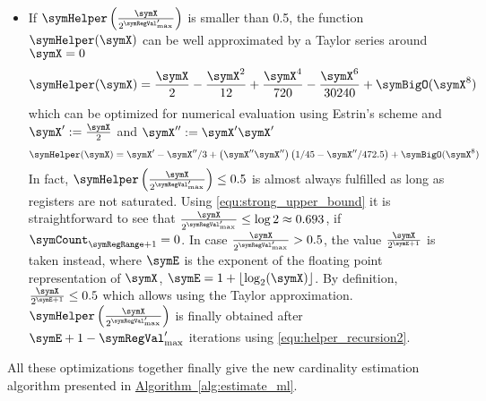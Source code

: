 \documentclass[a4paper]{scrartcl}
\newcommand*{\algoref}[1]{\hyperref[#1]{Algorithm~\ref*{#1}}}
\begin{document}
\begin{itemize}
\item If $\symHelper\left(\frac{\symX}{2^{\symRegVal'_\text{max}}}\right)$ is smaller than 0.5, the function $\symHelper(\symX)$ can be well approximated by a Taylor series around $\symX=0$
\begin{equation}
\symHelper(\symX)
=
\frac{\symX}{2} - \frac{\symX^2}{12} +\frac{\symX^4}{720}-\frac{\symX^6}{30240} + \symBigO(\symX^{8})
\end{equation}
which can be optimized for numerical evaluation using Estrin's scheme and $\symX' := \frac{\symX}{2}$ and $\symX'' := \symX' \symX'$
\begin{equation}
\label{equ:taylor}
\symHelper(\symX)
=
\symX' - \symX''/3 + \left(\symX'' \symX''\right)\left(1/45-\symX''/472.5\right)
+ \symBigO(\symX^{8})
\end{equation}
In fact, $\symHelper\left(\frac{\symX}{2^{\symRegVal'_\text{max}}}\right)\leq 0.5$ is almost always fulfilled as long as registers are not saturated. Using \eqref{equ:strong_upper_bound} it is straightforward to see that $\frac{\symX}{2^{\symRegVal'_\text{max}}} \leq \log 2 \approx 0.693$, if $\symCount_{\symRegRange+1}=0$.
In case $\frac{\symX}{2^{\symRegVal'_\text{max}}} > 0.5$, the value $\frac{\symX}{2^{\symE+1}}$ is taken instead, where $\symE$ is the exponent of the floating point representation of $\symX$, $\symE = 1+\lfloor\log_2(\symX)\rfloor$. By definition, $\frac{\symX}{2^{\symE+1}}\leq 0.5$ which allows using the Taylor approximation. $\symHelper\left(\frac{\symX}{2^{\symRegVal'_\text{max}}}\right)$ is finally obtained after $\symE + 1 -\symRegVal'_\text{max}$ iterations using \eqref{equ:helper_recursion2}.
\end{itemize}

All these optimizations together finally give the new cardinality estimation algorithm presented in \algoref{alg:estimate_ml}.
\end{document}
